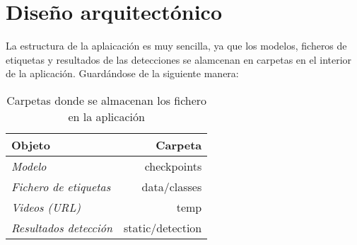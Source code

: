 \clearpage

\section{Diseño arquitectónico}
La estructura de la aplaicación es muy sencilla, ya que los modelos, ficheros de etiquetas y resultados de las detecciones se alamcenan en carpetas en el interior de la aplicación.
Guardándose de la siguiente manera:
\begin{table}[H]
    \centering
    \begin{tabular}{lr}
        \toprule
        \textbf{Objeto} & \textbf{Carpeta}\\
        \midrule
        \textit{Modelo} & checkpoints \\
        \textit{Fichero de etiquetas} & data\//classes \\
        \textit{Videos (URL)} & temp \\
        \textit{Resultados detección} & static\//detection \\
        \bottomrule
    \end{tabular}
    \caption{Carpetas donde se almacenan los fichero en la aplicación}
\end{table}
